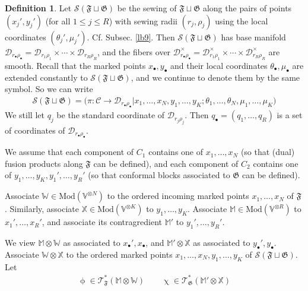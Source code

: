 \documentclass[11pt,b5paper,notitlepage]{article}
\theoremstyle{definition}
\newtheorem{df}{Definition}[section]
\theoremstyle{plain}
\newcommand{\blt}{\bullet}
\newcommand{\Vbb}{\mathbb V}
\newcommand{\Xbb}{\mathbb X}
\newcommand{\Wbb}{\mathbb W}
\newcommand{\Mbb}{\mathbb M}
\newcommand{\<}{\left\langle}
\renewcommand{\>}{\right\rangle}
\newcommand{\MC}{\mathcal{C}}
\newcommand{\ST}{\mathscr{T}}
\newcommand{\MD}{\mathcal{D}}
\newcommand{\MS}{\mathcal{S}}
\newcommand{\Mod}{\mathrm{Mod}}
\newcommand{\ff}{\mathfrak{F}}
\newcommand{\fg}{\mathfrak{G}}
\numberwithin{equation}{section}
\begin{document}
\begin{df}
Let $\MS(\ff\sqcup\fg)$ be the sewing of $\ff\sqcup\fg$ along the pairs of points $(x_j',y_j')$ (for all $1\leq j\leq R$) with sewing radii $(r_j,\rho_j)$ using the local coordinates $(\theta_j',\mu_j')$. Cf. Subsec. \ref{lb9}.  Then $\MS(\ff\sqcup\fg)$ has base manifold $\MD_{r_\blt\rho_\blt}=\MD_{r_1\rho_1}\times\cdots\times\MD_{r_R\rho_R}$, and the fibers over $\MD_{r_\blt\rho_\blt}^\times=\MD_{r_1\rho_1}^\times\times\cdots\times\MD_{r_R\rho_R}^\times$ are smooth. Recall that the marked points $x_\blt,y_\blt$ and their local coordinates $\theta_\blt,\mu_\blt$ are extended constantly to $\MS(\ff\sqcup\fg)$, and we continue to denote them by the same symbol. So we can write
\begin{align}\label{eq105}
\MS(\ff\sqcup\fg)=\big(\pi:\MC\rightarrow\MD_{r_\blt\rho_\blt}\big|x_1,\dots,x_N,y_1,\dots,y_K;\theta_1,\dots,\theta_N,\mu_1,\dots,\mu_K  \big)
\end{align}
We still let $q_j$ be the standard coordinate of $\MD_{r_j\rho_j}$. Then $q_\blt=(q_1,\dots,q_R)$ is a set of coordinates of $\MD_{r_\blt\rho_\blt}$.
\end{df}

We assume that each component of $C_1$ contains one of $x_1,\dots,x_N$ (so that (dual) fusion products along $\ff$ can be defined), and each component of $C_2$ contains one of $y_1,\dots,y_K,y_1',\dots,y_R'$ (so that conformal blocks associated to $\fg$ can be defined). 


Associate $\Wbb\in\Mod(\Vbb^{\otimes N})$ to the ordered incoming marked points $x_1,\dots,x_N$ of $\ff$. Similarly, associate $\Xbb\in\Mod(\Vbb^{\otimes K})$ to $y_1,\dots,y_K$. Associate $\Mbb\in\Mod(\Vbb^{\otimes R})$ to $x_1',\dots,x_R'$, and associate its contragredient $\Mbb'$ to $y_1',\dots,y_R'$. 

We view $\Mbb\otimes\Wbb$ as associated to $x_\blt',x_\blt$, and $\Mbb'\otimes\Xbb$ as associated to $y_\blt',y_\blt$. Associate $\Wbb\otimes\Xbb$ to the ordered marked points $x_1,\dots,x_N,y_1,\dots,y_K$ of $\MS(\ff\sqcup\fg)$. Let
\begin{align*}
\upphi\in\ST_\ff^*(\Mbb\otimes\Wbb)\qquad\upchi\in\ST^*_\fg(\Mbb'\otimes\Xbb)
\end{align*}
\end{document}
